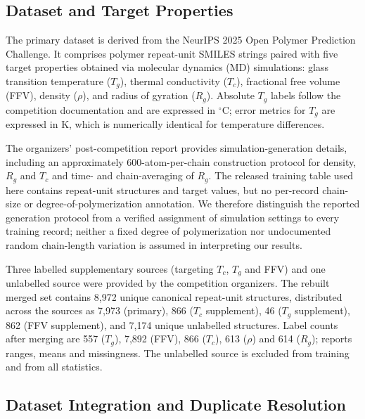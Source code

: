 \documentclass{article}
\begin{document}
\subsection{Dataset and Target Properties}

The primary dataset is derived from the NeurIPS 2025 Open Polymer Prediction Challenge.\cite{neurips-open-polymer-prediction-2025} It comprises polymer repeat-unit SMILES strings paired with five target properties obtained via molecular dynamics (MD) simulations: glass transition temperature ($T_g$), thermal conductivity ($T_c$), fractional free volume (FFV), density ($\rho$), and radius of gyration ($R_g$). Absolute $T_g$ labels follow the competition documentation and are expressed in $^\circ$C; error metrics for $T_g$ are expressed in K, which is numerically identical for temperature differences.

The organizers' post-competition report provides simulation-generation details, including an approximately 600-atom-per-chain construction protocol for density, $R_g$ and $T_c$ and time- and chain-averaging of $R_g$.\cite{liu_open_polymer_report_2025} The released training table used here contains repeat-unit structures and target values, but no per-record chain-size or degree-of-polymerization annotation. We therefore distinguish the reported generation protocol from a verified assignment of simulation settings to every training record; neither a fixed degree of polymerization nor undocumented random chain-length variation is assumed in interpreting our results.

Three labelled supplementary sources (targeting $T_c$, $T_g$ and FFV) and one unlabelled source were provided by the competition organizers. The rebuilt merged set contains 8{,}972 unique canonical repeat-unit structures, distributed across the sources as 7{,}973 (primary), 866 ($T_c$ supplement), 46 ($T_g$ supplement), 862 (FFV supplement), and 7{,}174 unique unlabelled structures. Label counts after merging are 557 ($T_g$), 7{,}892 (FFV), 866 ($T_c$), 613 ($\rho$) and 614 ($R_g$);  reports ranges, means and missingness. The unlabelled source is excluded from training and from all statistics.

\subsection{Dataset Integration and Duplicate Resolution}
\end{document}
